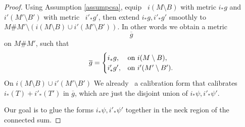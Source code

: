 \documentclass[11pt,a4paper]{amsart}
\numberwithin{equation}{section}
\newcommand{\ov}[1]{\overline{#1}}
\newcommand{\pf}{_\ast}
\newcommand{\imb}{i(M\setminus B)}
\newcommand{\imbb}{i'(M'\setminus B')}
\theoremstyle{plain}
\theoremstyle{definition}
\numberwithin{equation}{subsection}
\begin{document}
	\begin{proof}
		Using Assumption \ref{assumpcsa}, equip  $i(M\setminus B)$ with metric $i\pf g$ and $\imbb$ with metric  $i'\pf g'$, then extend $i\pf g,i'\pf g'$ smoothly to $M\# M'\setminus(\imb\cup\imbb)$. In other words we obtain a metric $$\ov{g}$$ on $M\# M'$, such that
		\begin{align*}
			\ov{g}=\begin{cases}
				i\pf g,&\textnormal{on }\imb,\\
				i'\pf g',&\textnormal{on }\imbb.
			\end{cases}
		\end{align*}On $\imb\cup \imbb$ We already  a calibration form that calibrates $i\pf(T)+i'\pf(T')$ in $\ov{g}$, which are just the disjoint union of $i\pf \psi,i'\pf\psi'.$
		
		
		Our goal is to glue the forms $i\pf\psi,i'\pf\psi'$ together in the neck region of the connected sum.
		

\end{proof}
\end{document}
